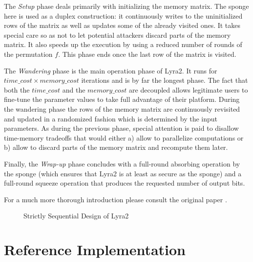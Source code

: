 The \emph{Setup} phase deals primarily with initializing the memory matrix. The sponge here is used as a duplex construction: it continuously writes to the uninitialized rows of the matrix as well as updates some of the already visited ones. It takes special care so as not to let potential attackers discard parts of the memory matrix. It also speeds up the execution by using a reduced number of rounds of the permutation \(f\). This phase ends once the last row of the matrix is visited.

The \emph{Wandering} phase is the main operation phase of Lyra2. It runs for \(time\_cost \times memory\_cost\) iterations and is by far the longest phase. The fact that both the \(time\_cost\) and the \(memory\_cost\) are decoupled allows legitimate users to fine-tune the parameter values to take full advantage of their platform. During the wandering phase the rows of the memory matrix are continuously revisited and updated in a randomized fashion which is determined by the input parameters. As during the previous phase, special attention is paid to disallow time-memory tradeoffs that would either a) allow to parallelize computations or b) allow to discard parts of the memory matrix and recompute them later.

Finally, the \emph{Wrap-up} phase concludes with a full-round absorbing operation by the sponge (which ensures that Lyra2 is at least as secure as the sponge) and a full-round squeeze operation that produces the requested number of output bits.

For a much more thorough introduction please consult the original paper \cite{andrade:2016:lyra2,marcos:2015:lyra2}.

\begin{figure}[H]
\centering
  \caption{Strictly Sequential Design of Lyra2}
  \label{fig:basic-structure-lyra2}
\end{figure}

\section{Reference Implementation}
\label{sec:reference-implementation}

